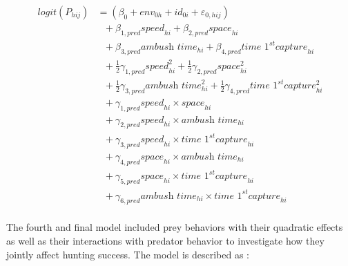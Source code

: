 \documentclass[
  11pt,
]{article}
\begin{document}
\[
\begin{aligned}
logit (P_{hij}) &= (\beta_{0} + env_{0h} + id_{0i} + \varepsilon_{0,hij}) \\
&\text{ } + \beta_{1,pred} \textit{speed}_{hi} + \beta_{2,pred} \textit{space}_{hi} \\
&\text{ } + \beta_{3,pred} \textit{ambush time}_{hi} + \beta_{4,pred} \textit{time 1}^{st} \textit{capture}_{hi} \\
&\text{ } + \frac{1}{2} \gamma_{1,pred} \textit{speed}_{hi}^{2} + \frac{1}{2} \gamma_{2,pred} \textit{space}_{hi}^{2} \\
&\text{ } + \frac{1}{2} \gamma_{3,pred} \textit{ambush time}_{hi}^{2} + \frac{1}{2} \gamma_{4,pred} \textit{time 1}^{st} \textit{capture}_{hi}^{2} \\
&\text{ } + \gamma_{1,pred}\textit{speed}_{hi} \times \textit{space}_{hi} \\
&\text{ } + \gamma_{2,pred}\textit{speed}_{hi} \times \textit{ambush time}_{hi} \\ 
&\text{ } + \gamma_{3,pred}\textit{speed}_{hi} \times \textit{time 1}^{st} \textit{capture}_{hi} \\
&\text{ } + \gamma_{4,pred}\textit{space}_{hi} \times \textit{ambush time}_{hi} \\
&\text{ } + \gamma_{5,pred}\textit{space}_{hi} \times \textit{time 1}^{st} \textit{capture}_{hi} \\
&\text{ } + \gamma_{6,pred}\textit{ambush time}_{hi} \times \textit{time 1}^{st} \textit{capture}_{hi} \\
\end{aligned}
\tag{S7}
\]

\newpage

The fourth and final model included prey behaviors with their quadratic
effects as well as their interactions with predator behavior to
investigate how they jointly affect hunting success. The model is
described as :
\end{document}
